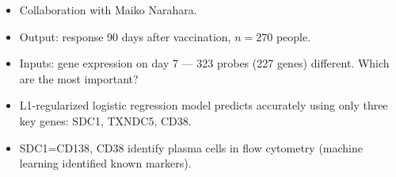 \documentclass{beamer}
\begin{document}
\begin{frame}
\begin{itemize}
\item Collaboration with Maiko Narahara.
\item Output: response 90 days after vaccination, $n=270$ people.
\item Inputs: gene expression on day 7 --- 323 probes (227 genes)
  different. Which are the most important?
\item<2> L1-regularized logistic regression model predicts accurately
using only three key genes: SDC1, TXNDC5, CD38.
\item<2> SDC1=CD138, CD38 identify plasma cells in flow cytometry
  (machine learning identified known markers).
\end{itemize}






\end{frame}
\end{document}
